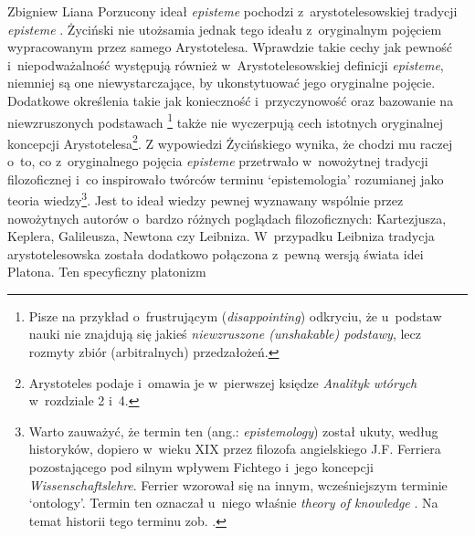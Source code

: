 \begin{artplenv}{Zbigniew Liana}
Porzucony ideał \textit{episteme} pochodzi z~arystotelesowskiej tradycji \textit{episteme}
\parencites[s.~102]{zycinski_jezyk_1983}[s.~46–55]{zycinski_granice_1993}.
Życiński nie utożsamia jednak tego ideału z~oryginalnym pojęciem wypracowanym
przez samego Arystotelesa. Wprawdzie takie cechy jak pewność i~niepodważalność występują również w~Arystotelesowskiej
definicji \textit{episteme}, niemniej są one niewystarczające, by ukonstytuować jego oryginalne pojęcie. Dodatkowe
określenia takie jak konieczność i~przyczynowość
\parencite[s.~46]{zycinski_granice_1993}
oraz bazowanie na
niewzruszonych podstawach
\parencites[s.~143]{zycinski_structure_1988}[s.~253]{zycinski_struktura_2013}\footnote{Pisze na
przykład o~frustrującym (\textit{disappointing})
odkryciu, że u~podstaw nauki nie znajdują się jakieś \textit{niewzruszone (unshakable) podstawy}, lecz rozmyty zbiór
(arbitralnych) przedzałożeń.} także nie wyczerpują cech istotnych oryginalnej koncepcji
Arystotelesa\footnote{Arystoteles podaje i~omawia je w~pierwszej księdze \textit{Analityk wtórych} w~rozdziale 2 i~4.}. Z
wypowiedzi Życińskiego
\parencite*[s.~46]{zycinski_granice_1993}
wynika, że chodzi mu raczej o~to, co z~oryginalnego
pojęcia \textit{episteme} przetrwało w~nowożytnej tradycji filozoficznej i~co inspirowało twórców terminu `epistemologia'
rozumianej jako teoria wiedzy\footnote{\label{lia-foo-32}Warto zauważyć, że termin ten (ang.: \textit{epistemology}) został ukuty,
według historyków, dopiero w~wieku XIX przez filozofa angielskiego J.F. Ferriera
pozostającego pod silnym wpływem Fichtego i~jego
koncepcji \textit{Wissenschaftslehre}. Ferrier wzorował się na innym, wcześniejszym terminie `ontology'. Termin ten
oznaczał u~niego właśnie \textit{theory of knowledge}
\parencite[zob.][s.~44]{ferrier_institutes_1854}.
Na temat
historii tego terminu zob.
\parencite[s.~63–66]{sinacoer_lepistemologie_1973}.
}. Jest to ideał wiedzy pewnej
wyznawany wspólnie przez nowożytnych autorów o~bardzo różnych poglądach filozoficznych: Kartezjusza, Keplera,
Galileusza, Newtona czy Leibniza. W~przypadku Leibniza
\parencite[s.~51]{zycinski_granice_1993}
tradycja arystotelesowska została dodatkowo połączona z~pewną wersją świata idei Platona. Ten specyficzny platonizm

\end{artplenv}
